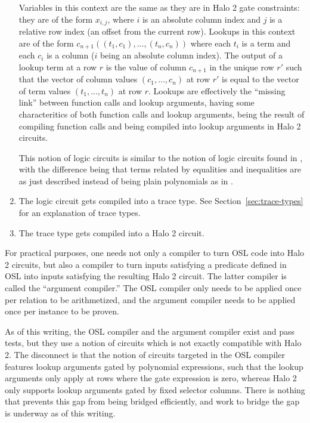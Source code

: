 \documentclass[11pt]{article}
\begin{document}
\begin{enumerate}
		Variables in this context are the same as they are in Halo 2 gate constraints: they are of the form $x_{i,j}$, where $i$ is an absolute column index and $j$ is a relative row index (an offset from the current row). Lookups in this context are of the form $c_{n+1}((t_1, c_1), ..., (t_n, c_n))$ where each $t_i$ is a term and each $c_i$ is a column ($i$ being an absolute column index). The output of a lookup term at a row $r$ is the value of column $c_{n+1}$ in the unique row $r'$ such that the vector of column values $(c_1, ..., c_n)$ at row $r'$ is equal to the vector of term values $(t_1, ..., t_n)$ at row $r$. Lookups are effectively the ``missing link'' between function calls and lookup arguments, having some characteritics of both function calls and lookup arguments, being the result of compiling function calls and being compiled into lookup arguments in Halo 2 circuits.

		This notion of logic circuits is similar to the notion of logic circuits found in \cite{sigma11-poly-bounds}, with the difference being that terms related by equalities and inequalities are as just described instead of being plain polynomials as in \cite{sigma11-poly-bounds}.

	\item The logic circuit gets compiled into a trace type. See Section~\ref{sec:trace-types} for an explanation of trace types.
	\item The trace type gets compiled into a Halo 2 circuit.
\end{enumerate}

For practical purposes, one needs not only a compiler to turn OSL code into Halo 2 circuits, but also a compiler to turn inputs satisfying a predicate defined in OSL into inputs satisfying the resulting Halo 2 circuit. The latter compiler is called the ``argument compiler.'' The OSL compiler only needs to be applied once per relation to be arithmetized, and the argument compiler needs to be applied once per instance to be proven.

As of this writing, the OSL compiler and the argument compiler exist and pass tests, but they use a notion of circuits which is not exactly compatible with Halo 2. The disconnect is that the notion of circuits targeted in the OSL compiler features lookup arguments gated by polynomial expressions, such that the lookup arguments only apply at rows where the gate expression is zero, whereas Halo 2 only supports lookup arguments gated by fixed selector columns. There is nothing that prevents this gap from being bridged efficiently, and work to bridge the gap is underway as of this writing.
\end{document}
